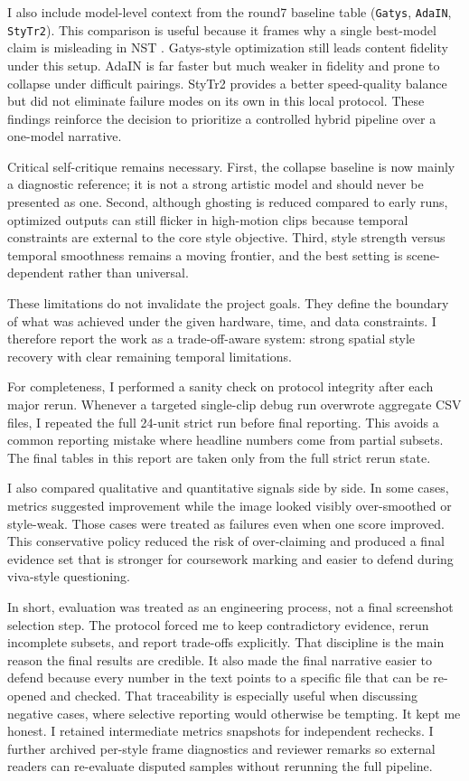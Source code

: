 \documentclass[12pt,letterpaper]{article}
\begin{document}
I also include model-level context from the round7 baseline table (\texttt{Gatys}, \texttt{AdaIN}, \texttt{StyTr2}). This comparison is useful because it frames why a single best-model claim is misleading in NST \cite{huang2017} \cite{deng2022}. Gatys-style optimization still leads content fidelity under this setup. AdaIN is far faster but much weaker in fidelity and prone to collapse under difficult pairings. StyTr2 provides a better speed-quality balance but did not eliminate failure modes on its own in this local protocol. These findings reinforce the decision to prioritize a controlled hybrid pipeline over a one-model narrative.

Critical self-critique remains necessary. First, the collapse baseline is now mainly a diagnostic reference; it is not a strong artistic model and should never be presented as one. Second, although ghosting is reduced compared to early runs, optimized outputs can still flicker in high-motion clips because temporal constraints are external to the core style objective. Third, style strength versus temporal smoothness remains a moving frontier, and the best setting is scene-dependent rather than universal.

These limitations do not invalidate the project goals. They define the boundary of what was achieved under the given hardware, time, and data constraints. I therefore report the work as a trade-off-aware system: strong spatial style recovery with clear remaining temporal limitations.

For completeness, I performed a sanity check on protocol integrity after each major rerun. Whenever a targeted single-clip debug run overwrote aggregate CSV files, I repeated the full 24-unit strict run before final reporting. This avoids a common reporting mistake where headline numbers come from partial subsets. The final tables in this report are taken only from the full strict rerun state.

I also compared qualitative and quantitative signals side by side. In some cases, metrics suggested improvement while the image looked visibly over-smoothed or style-weak. Those cases were treated as failures even when one score improved. This conservative policy reduced the risk of over-claiming and produced a final evidence set that is stronger for coursework marking and easier to defend during viva-style questioning.

In short, evaluation was treated as an engineering process, not a final screenshot selection step. The protocol forced me to keep contradictory evidence, rerun incomplete subsets, and report trade-offs explicitly. That discipline is the main reason the final results are credible. It also made the final narrative easier to defend because every number in the text points to a specific file that can be re-opened and checked. That traceability is especially useful when discussing negative cases, where selective reporting would otherwise be tempting. It kept me honest. I retained intermediate metrics snapshots for independent rechecks. I further archived per-style frame diagnostics and reviewer remarks so external readers can re-evaluate disputed samples without rerunning the full pipeline.
\end{document}

